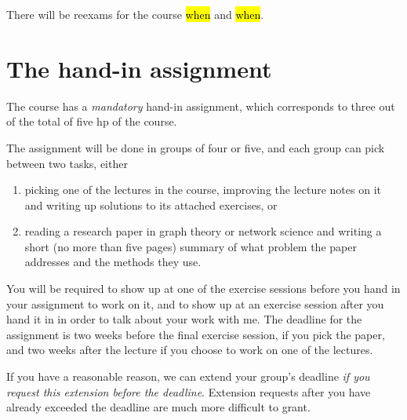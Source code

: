 \documentclass{tufte-handout}
\begin{document}
There will be reexams for the course \hl{when} and \hl{when}.

\section{The hand-in assignment}

The course has a \emph{mandatory} hand-in assignment, which corresponds to three out of the total of five hp of the course.

The assignment will be done in groups of four or five, and each group can pick between two tasks, either
\begin{enumerate}
  \item picking one of the lectures in the course, improving the lecture notes on it and writing up solutions to its attached exercises, or
  \item reading a research paper in graph theory or network science and writing a short (no more than five pages) summary of what problem the paper addresses and the methods they use.
\end{enumerate}

You will be required to show up at one of the exercise sessions before you hand in your assignment to work on it, and to show up at an exercise session after you hand it in in order to talk about your work with me. The deadline for the assignment is two weeks before the final exercise session, if you pick the paper, and two weeks after the lecture if you choose to work on one of the lectures.

If you have a reasonable reason, we can extend your group's deadline \emph{if you request this extension before the deadline}. Extension requests after you have already exceeded the deadline are much more difficult to grant.



\end{document}
